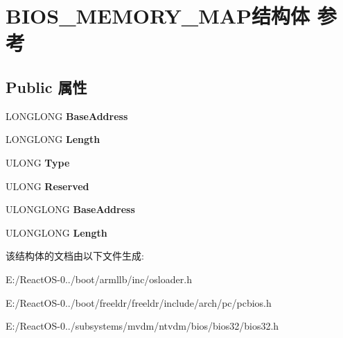 \hypertarget{struct_b_i_o_s___m_e_m_o_r_y___m_a_p}{}\section{B\+I\+O\+S\+\_\+\+M\+E\+M\+O\+R\+Y\+\_\+\+M\+A\+P结构体 参考}
\label{struct_b_i_o_s___m_e_m_o_r_y___m_a_p}
\subsection*{Public 属性}
\begin{DoxyCompactItemize}
\item 
\mbox{\label{struct_b_i_o_s___m_e_m_o_r_y___m_a_p_a0aa9c136a0cc9691b37d17dd8d3bfa56}} 
L\+O\+N\+G\+L\+O\+NG {\bfseries Base\+Address}
\item 
\mbox{\label{struct_b_i_o_s___m_e_m_o_r_y___m_a_p_a1d717738ffc9897a0cc6b4d71b0617d6}} 
L\+O\+N\+G\+L\+O\+NG {\bfseries Length}
\item 
\mbox{\label{struct_b_i_o_s___m_e_m_o_r_y___m_a_p_ad61d0da82bbbfc03eb09ec85917bcae8}} 
U\+L\+O\+NG {\bfseries Type}
\item 
\mbox{\label{struct_b_i_o_s___m_e_m_o_r_y___m_a_p_ac1c08c4683d2b4725af46700a782f51e}} 
U\+L\+O\+NG {\bfseries Reserved}
\item 
\mbox{\label{struct_b_i_o_s___m_e_m_o_r_y___m_a_p_a0aa9c136a0cc9691b37d17dd8d3bfa56}} 
U\+L\+O\+N\+G\+L\+O\+NG {\bfseries Base\+Address}
\item 
\mbox{\label{struct_b_i_o_s___m_e_m_o_r_y___m_a_p_a1d717738ffc9897a0cc6b4d71b0617d6}} 
U\+L\+O\+N\+G\+L\+O\+NG {\bfseries Length}
\end{DoxyCompactItemize}


该结构体的文档由以下文件生成\+:\begin{DoxyCompactItemize}
\item 
E\+:/\+React\+O\+S-\/0../boot/armllb/inc/osloader.\+h\item 
E\+:/\+React\+O\+S-\/0../boot/freeldr/freeldr/include/arch/pc/pcbios.\+h\item 
E\+:/\+React\+O\+S-\/0../subsystems/mvdm/ntvdm/bios/bios32/bios32.\+h\end{DoxyCompactItemize}
